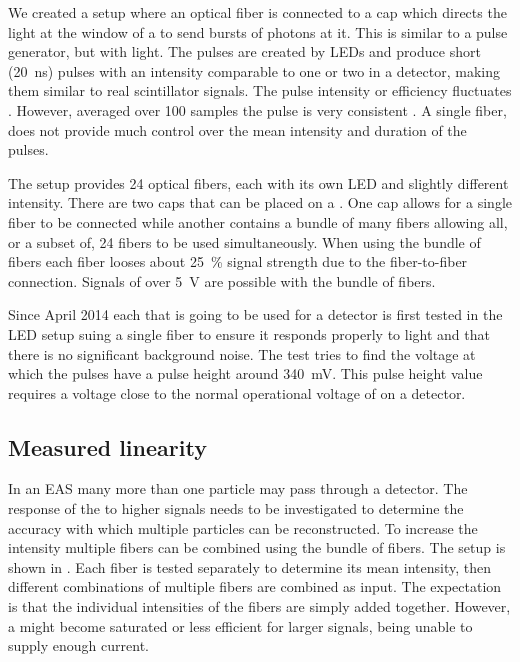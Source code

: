We created a setup where an optical fiber is connected to a cap which
directs the light at the window of a \pmt to send bursts of photons at
it. This is similar to a pulse generator, but with light. The pulses are
created by LEDs and produce short (\SI{20}{\nano\second}) pulses with an
intensity comparable to one or two \mip in a detector, making them
similar to real scintillator signals. The pulse intensity or efficiency
fluctuates . However,
averaged over 100 samples the pulse is very consistent
. A single fiber,
does not provide much control over the mean intensity and duration of
the pulses.

The setup provides 24 optical fibers, each with its own LED and slightly
different intensity. There are two caps that can be placed on a \pmt.
One cap allows for a single fiber to be connected while another contains
a bundle of many fibers allowing all, or a subset of, 24 fibers to be
used simultaneously. When using the bundle of fibers each fiber looses about
\SI{25}{\percent} signal strength due to the fiber-to-fiber connection.
Signals of over \SI{5}{\volt} are possible with the bundle of fibers.

Since April 2014 each \pmt that is going to be used for a \hisparc
detector is first tested in the LED setup suing a single fiber to ensure
it responds properly to light and that there is no significant
background noise. The test tries to find the voltage at which the pulses
have a pulse height around \SI{340}{\milli\volt}. This pulse height
value requires a voltage close to the normal operational voltage of
\pmts on a \hisparc detector.


\subsection{Measured linearity}

In an EAS many more than one particle may pass through a detector. The
response of the \pmt to higher signals needs to be investigated to
determine the accuracy with which multiple particles can be
reconstructed. To increase the intensity multiple fibers can be combined
using the bundle of fibers. The setup is shown in . Each fiber is tested separately to determine
its mean intensity, then different combinations of multiple fibers are
combined as input. The expectation is that the individual intensities of
the fibers are simply added together. However, a \pmt might become
saturated or less efficient for larger signals, being unable to supply
enough current.

